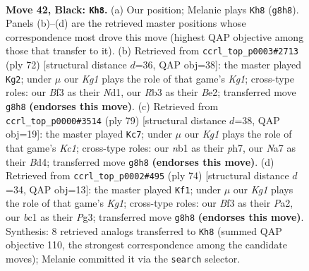 \documentclass[11pt]{article}
\begin{document}
\clearpage

\begin{figure}[p]\centering
\begin{subfigure}{0.46\textwidth}\centering
\resizebox{\linewidth}{!}{%
\newchessgame
\chessboard[
  setfen={6k1/n2K1p1p/p1P5/P4p2/4p3/1r3bP1/8/RNB5 b - - 2 42},
  showmover=false,
  pgfstyle=straightmove, color=movearrow, markmove={g8-h8}
]}
\caption{}
\end{subfigure}\hfill
\begin{subfigure}{0.46\textwidth}\centering
\resizebox{\linewidth}{!}{%
\newchessgame
\chessboard[
  setfen={1r4k1/5p2/6p1/bP1p4/2n5/6P1/2R1BP1P/3N2K1 w - - 3 37},
  showmover=false,
  pgfstyle=straightmove, color=movearrow, markmove={g1-g2}
]}
\caption{}
\end{subfigure}
\\[4pt]
\begin{subfigure}{0.46\textwidth}\centering
\resizebox{\linewidth}{!}{%
\newchessgame
\chessboard[
  setfen={2k4r/1p2p2P/p1p1p3/8/3bN1RP/P7/1P2K3/8 b - - 0 40},
  showmover=false,
  pgfstyle=straightmove, color=movearrow, markmove={c8-c7}
]}
\caption{}
\end{subfigure}\hfill
\begin{subfigure}{0.46\textwidth}\centering
\resizebox{\linewidth}{!}{%
\newchessgame
\chessboard[
  setfen={b3r3/R7/4k1pp/1P2p3/2p4N/6P1/P4P1P/6K1 w - - 1 38},
  showmover=false,
  pgfstyle=straightmove, color=movearrow, markmove={g1-f1}
]}
\caption{}
\end{subfigure}
\caption{\textbf{Move 42, Black: \texttt{Kh8}.} (a) Our position; Melanie plays \texttt{Kh8} (\texttt{g8h8}). Panels (b)--(d) are the retrieved master positions whose correspondence most drove this move (highest QAP objective among those that transfer to it). (b) Retrieved from \texttt{ccrl\_top\_p0003\#2713} (ply 72) [structural distance $d$=36, QAP obj=38]: the master played \texttt{Kg2}; under $\mu$ our \emph{Kg1} plays the role of that game's \emph{Kg1}; cross-type roles: our \emph{B}f3 as their \emph{N}d1, our \emph{R}b3 as their \emph{B}e2; transferred move \texttt{g8h8} \textbf{(endorses this move)}. (c) Retrieved from \texttt{ccrl\_top\_p0000\#3514} (ply 79) [structural distance $d$=38, QAP obj=19]: the master played \texttt{Kc7}; under $\mu$ our \emph{Kg1} plays the role of that game's \emph{Kc1}; cross-type roles: our \emph{n}b1 as their \emph{p}h7, our \emph{N}a7 as their \emph{B}d4; transferred move \texttt{g8h8} \textbf{(endorses this move)}. (d) Retrieved from \texttt{ccrl\_top\_p0002\#495} (ply 74) [structural distance $d$=34, QAP obj=13]: the master played \texttt{Kf1}; under $\mu$ our \emph{Kg1} plays the role of that game's \emph{Kg1}; cross-type roles: our \emph{B}f3 as their \emph{P}a2, our \emph{b}c1 as their \emph{P}g3; transferred move \texttt{g8h8} \textbf{(endorses this move)}. Synthesis: 8 retrieved analogs transferred to \texttt{Kh8} (summed QAP objective 110, the strongest correspondence among the candidate moves); Melanie committed it via the \texttt{search} selector.}
\label{fig:thought-m83}
\end{figure}
\end{document}
